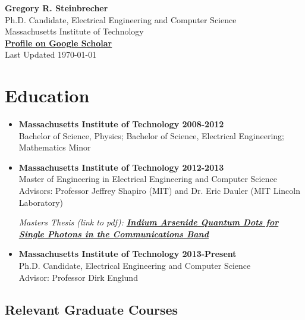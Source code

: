 \documentclass[letterpaper,12pt]{article}
\begin{document}
\begin{center}
{\huge \textbf{Gregory R. Steinbrecher}}\\
\vspace{5mm}
{\normalsize Ph.D. Candidate, Electrical Engineering and Computer Science\\
Massachusetts Institute of Technology}\\
{\small \href{https://scholar.google.com/citations?user=RPAnJ3cAAAAJ}{\textbf{Profile on Google Scholar}}}\\
\vspace{5mm}
{\small Last Updated \today}\\
\end{center}

\section{Education}

\begin{itemize}

\item \textbf{Massachusetts Institute of Technology 2008-2012}\\
Bachelor of Science, Physics; Bachelor of Science, Electrical Engineering; Mathematics Minor

\item \textbf{Massachusetts Institute of Technology 2012-2013}\\
Master of Engineering in Electrical Engineering and Computer Science\\
Advisors: Professor Jeffrey Shapiro (MIT) and Dr. Eric Dauler (MIT Lincoln Laboratory)

\vspace{0.5em}

{\small \emph{Masters Thesis (link to pdf): \href{http://web.mit.edu/gstein/www/steinbrecher-meng-thesis.pdf}{\textbf{Indium Arsenide Quantum Dots for Single Photons in the Communications Band}}}}

\item \textbf{Massachusetts Institute of Technology 2013-Present}\\
Ph.D. Candidate, Electrical Engineering and Computer Science\\
Advisor: Professor Dirk Englund

\end{itemize}

\subsection{Relevant Graduate Courses}
\end{document}
